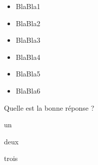\begin{acquis}
\begin{itemize}
\item BlaBla1
\item BlaBla2
\item BlaBla3
\item BlaBla4
\item BlaBla5
\item BlaBla6
\end{itemize}
\end{acquis}


\begin{QCM}
  \begin{GroupeQCM} %
    \begin{exercice}
      Quelle est la bonne réponse ?
      \begin{ChoixQCM}{4}
      \item un
      \item deux
      \item trois
      \end{ChoixQCM}
\begin{corrige}
   \end{corrige}
    \end{exercice}


\end{GroupeQCM}
\end{QCM}

  